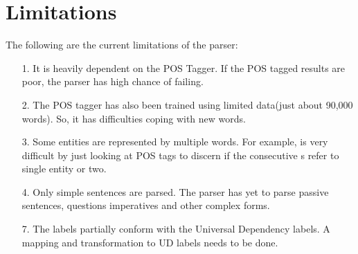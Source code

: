 \chapter{Limitations}
The following are the current limitations of the parser:
\begin{itemize}
    \item[1.] It is heavily dependent on the POS Tagger. If the POS tagged results are poor, the parser has high chance of failing.
    \item[2.] The POS tagger has also been trained using limited data(just about 90,000 words). So, it has difficulties coping with new words.
    \item[3.] Some entities are represented by multiple words. For example,
        is very difficult by just looking at POS tags to discern if the
        consecutive s refer to single entity or two.
    \item[4.] Only simple sentences are parsed. The parser has yet to parse passive sentences, questions imperatives and other complex forms.
    \item[7.] The labels partially conform with the Universal Dependency labels. A
        mapping and transformation to UD labels needs to be done.
\end{itemize}



